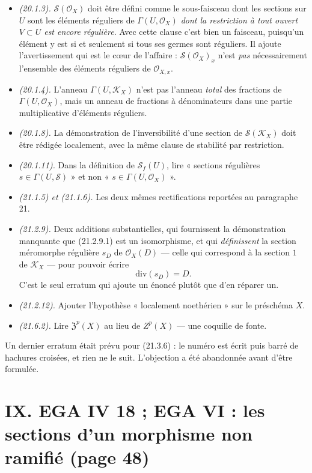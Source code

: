\documentclass[11pt,a4paper]{article}
\begin{document}
\begin{itemize}
  \item \emph{(20.1.3).} $\mathcal{S}(\mathcal{O}_X)$ doit être défini comme le
  sous-faisceau dont les sections sur $U$ sont les éléments réguliers de
  $\Gamma(U, \mathcal{O}_X)$ \emph{dont la restriction à tout ouvert $V \subset
  U$ est encore régulière}. Avec cette clause c'est bien un faisceau, puisqu'un
  élément y est si et seulement si tous ses germes sont réguliers. Il ajoute
  l'avertissement qui est le cœur de l'affaire : $\mathcal{S}(\mathcal{O}_X)_x$
  n'est \emph{pas} nécessairement l'ensemble des éléments réguliers de
  $\mathcal{O}_{X,x}$.
  \item \emph{(20.1.4).} L'anneau $\Gamma(U, \mathcal{K}_X)$ n'est pas l'anneau
  \emph{total} des fractions de $\Gamma(U, \mathcal{O}_X)$, mais un anneau de
  fractions à dénominateurs dans une partie multiplicative d'éléments
  réguliers.
  \item \emph{(20.1.8).} La démonstration de l'inversibilité d'une section de
  $\mathcal{S}(\mathcal{K}_X)$ doit être rédigée localement, avec la même clause
  de stabilité par restriction.
  \item \emph{(20.1.11).} Dans la définition de $\mathcal{S}_f(U)$, lire
  « sections régulières $s \in \Gamma(U, \mathcal{S})$ » et non
  « $s \in \Gamma(U, \mathcal{O}_X)$ ».
  \item \emph{(21.1.5) et (21.1.6).} Les deux mêmes rectifications reportées au
  paragraphe 21.
  \item \emph{(21.2.9).} Deux additions substantielles, qui fournissent la
  démonstration manquante que (21.2.9.1) est un isomorphisme, et qui
  \emph{définissent} la section méromorphe régulière $s_{D}$ de
  $\mathcal{O}_X(D)$ — celle qui correspond à la section $1$ de
  $\mathcal{K}_X$ — pour pouvoir écrire
  \[
    \mathrm{div}(s_{D}) = D .
  \]
  C'est le seul erratum qui ajoute un énoncé plutôt que d'en réparer un.
  \item \emph{(21.2.12).} Ajouter l'hypothèse « localement noethérien » sur le
  préschéma $X$.
  \item \emph{(21.6.2).} Lire $\mathfrak{Z}^{p}(X)$ au lieu de $Z^{p}(X)$ — une
  coquille de fonte.
\end{itemize}

Un dernier erratum était prévu pour (21.3.6) : le numéro est écrit puis barré de
hachures croisées, et rien ne le suit. L'objection a été abandonnée avant
d'être formulée.

\section*{IX. EGA IV 18 ; EGA VI : les sections d'un morphisme non ramifié (page 48)}
\end{document}
